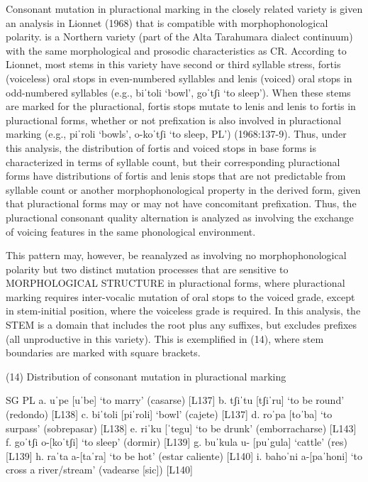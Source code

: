 Consonant mutation in pluractional marking in the closely related  variety is given an analysis in Lionnet (1968) that is compatible with morphophonological polarity.  is a Northern variety (part of the Alta Tarahumara dialect continuum) with the same morphological and prosodic characteristics as CR. According to Lionnet, most stems in this variety have second or third syllable stress, fortis (voiceless) oral stops in even-numbered syllables and lenis (voiced) oral stops in odd-numbered syllables (e.g., biˈtoli ‘bowl’, goˈtʃi ‘to sleep’). When these stems are marked for the pluractional, fortis stops mutate to lenis and lenis to fortis in pluractional forms, whether or not prefixation is also involved in pluractional marking (e.g., piˈroli ‘bowls’, o-koˈtʃi ‘to sleep, PL’) (1968:137-9).  Thus, under this analysis, the distribution of fortis and voiced stops in base forms is characterized in terms of syllable count, but their corresponding pluractional forms have distributions of fortis and lenis stops that are not predictable from syllable count or another morphophonological property in the derived form, given that pluractional forms may or may not have concomitant prefixation. Thus, the pluractional consonant quality alternation is analyzed as involving the exchange of voicing features in the same phonological environment.

This pattern may, however, be reanalyzed as involving no morphophonological polarity but two distinct mutation processes that are sensitive to MORPHOLOGICAL STRUCTURE in pluractional forms, where pluractional marking requires inter-vocalic mutation of oral stops to the voiced grade, except in stem-initial position, where the voiceless grade is required. In this analysis, the STEM is a domain that includes the root plus any suffixes, but excludes prefixes (all unproductive in this variety). This is exemplified in (14), where stem boundaries are marked with square brackets.

(14)	Distribution of consonant mutation in  pluractional marking

	SG			PL
a.	uˈpe		[uˈbe]			‘to marry’ (casarse)				[L137]
b.	tʃiˈtu		[tʃiˈru]			‘to be round’ (redondo)				[L138]
c.	biˈtoli		[piˈroli] 		‘bowl’ (cajete)					[L137]
d.	roˈpa		[toˈba]			‘to surpass’ (sobrepasar)			[L138]
e.	riˈku		[ˈtegu]			‘to be drunk’ (emborracharse)			[L143]
f.	goˈtʃi		o-[koˈtʃi] 		‘to sleep’ (dormir)				[L139]
g.	buˈkula		u- [puˈgula]		‘cattle’ (res)					[L139]
h.	raˈta		a-[taˈra]		‘to be hot’ (estar caliente)			[L140]
i.	bahoˈni		a-[paˈhoni]		‘to cross a river/stream’ (vadearse [sic])		[L140]

